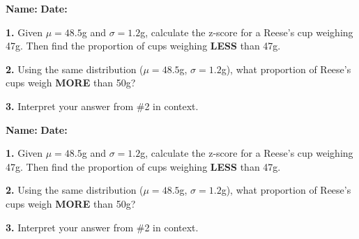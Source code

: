 \documentclass[11pt]{article}
\begin{document}
\begin{tcolorbox}[colback=blue!5!white,colframe=blue!75!black,title=Exit Ticket: Z-Scores to Proportions]
\textbf{Name:} \underline{\hspace{3in}} \textbf{Date:} \underline{\hspace{1in}}

\vspace{0.1in}

\textbf{1.} Given $\mu = 48.5$g and $\sigma = 1.2$g, calculate the z-score for a Reese's cup weighing 47g. Then find the proportion of cups weighing \textbf{LESS} than 47g.

\vspace{0.4in}

\textbf{2.} Using the same distribution ($\mu = 48.5$g, $\sigma = 1.2$g), what proportion of Reese's cups weigh \textbf{MORE} than 50g?

\vspace{0.4in}

\textbf{3.} Interpret your answer from \#2 in context.

\vspace{0.4in}

\end{tcolorbox}

\vspace{0.1in}

\begin{tcolorbox}[colback=blue!5!white,colframe=blue!75!black,title=Exit Ticket: Z-Scores to Proportions]
\textbf{Name:} \underline{\hspace{3in}} \textbf{Date:} \underline{\hspace{1in}}

\vspace{0.1in}

\textbf{1.} Given $\mu = 48.5$g and $\sigma = 1.2$g, calculate the z-score for a Reese's cup weighing 47g. Then find the proportion of cups weighing \textbf{LESS} than 47g.

\vspace{0.4in}

\textbf{2.} Using the same distribution ($\mu = 48.5$g, $\sigma = 1.2$g), what proportion of Reese's cups weigh \textbf{MORE} than 50g?

\vspace{0.4in}

\textbf{3.} Interpret your answer from \#2 in context.

\vspace{0.4in}

\end{tcolorbox}
\end{document}
